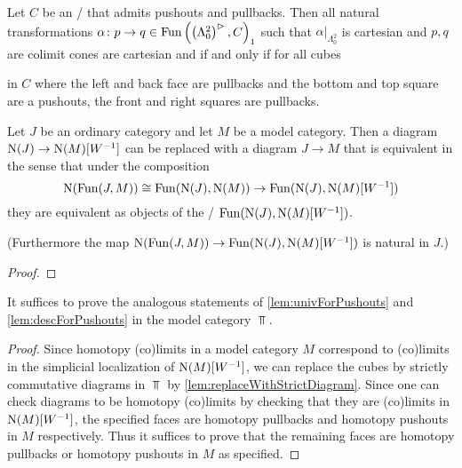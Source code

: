 \begin{lemma}\label{lem:descForPushouts}
    Let $C$ be an \inftycat/ that admits pushouts and pullbacks.
    Then all natural transformations $\alpha\colon p\to q\in\operatorname{Fun}\left(\left(\Lambda^2_0\right)^{\rhd},C\right)_1$ such that $\alpha|_{\Lambda^2_0}$ is cartesian and $p,q$ are colimit cones are cartesian and if and only if for all cubes
    \begin{center}
    \end{center}
    in $C$ where the left and back face are pullbacks and the bottom and top square are a pushouts, the front and right squares are pullbacks.
\end{lemma}
\begin{lemma}\label{lem:replaceWithStrictDiagram} %
    Let $J$ be an ordinary category and let $M$ be a model category.
    Then a diagram $\operatorname{N}(J)\to\operatorname{N}(M)[W^{-1}]$ can be replaced with a diagram $J\to M$ that is equivalent in the sense that under the composition
    \begin{equation*}
        \operatorname{N}(\operatorname{Fun}(J,M))\cong\operatorname{Fun}(\operatorname{N}(J),\operatorname{N}(M))\to\operatorname{Fun}(\operatorname{N}(J),\operatorname{N}(M)[W^{-1}])
    \end{equation*} 
    they are equivalent as objects of the \inftycat/ $\operatorname{Fun}(\operatorname{N}(J),\operatorname{N}(M)[W^{-1}])$.

    (Furthermore the map $\operatorname{N}(\operatorname{Fun}(J,M))\to\operatorname{Fun}(\operatorname{N}(J),\operatorname{N}(M)[W^{-1}])$ is natural in $J$.)
    \begin{proof}
    \end{proof}
\end{lemma}
\begin{corollary}
    It suffices to prove the analogous statements of \cref{lem:univForPushouts} and \cref{lem:descForPushouts} in the model category $\Top$.
    \begin{proof}
        Since homotopy (co)limits in a model category $M$ correspond to (co)limits in the simplicial localization of $\operatorname{N}(M)[W^{-1}]$, we can replace the cubes by strictly commutative diagrams in $\Top$ by \cref{lem:replaceWithStrictDiagram}.
        Since one can check diagrams to be homotopy (co)limits by checking that they are (co)limits in $\operatorname{N}(M)[W^{-1}]$, the specified faces are homotopy pullbacks and homotopy pushouts in $M$ respectively.
        Thus it suffices to prove that the remaining faces are homotopy pullbacks or homotopy pushouts in $M$ as specified.
    \end{proof}
\end{corollary}
